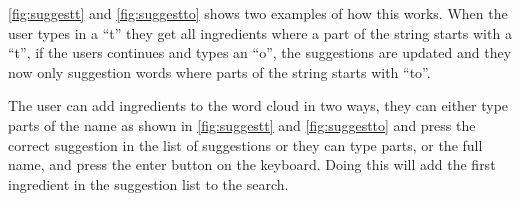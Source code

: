 \autoref{fig:suggestt} and \autoref{fig:suggestto} shows two examples of how this works. When the user types in a ``t'' they get all ingredients where a part of the string starts with a ``t'', if the users continues and types an ``o'', the suggestions are updated and they now only suggestion words where parts of the string starts with ``to''. 

The user can add ingredients to the word cloud in two ways, they can either type parts of the name as shown in \autoref{fig:suggestt} and \autoref{fig:suggestto} and press the correct suggestion in the list of suggestions or they can type parts, or the full name, and press the enter button on the keyboard. Doing this will add the first ingredient in the suggestion list to the search.

